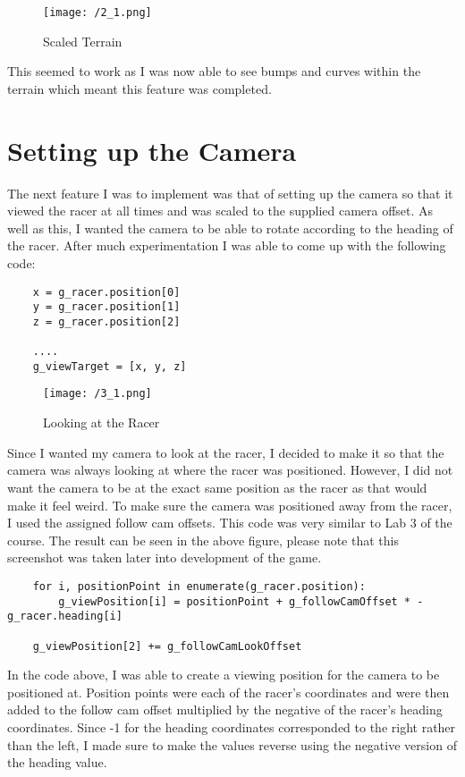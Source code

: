 \documentclass[11pt, oneside, a4paper]{article}
\begin{document}
\begin{figure}[!ht]
	\centerline{\texttt{[image: /2\_1.png]}}
	\caption{Scaled Terrain}
	\label{fig:figure1}
\end{figure}

This seemed to work as I was now able to see bumps and curves within the terrain which meant this feature was completed.

\section{Setting up the Camera}
The next feature I was to implement was that of setting up the camera so that it viewed the racer at all times and was scaled to the supplied camera offset. As well as this, I wanted the camera to be able to rotate according to the heading of the racer. After much experimentation I was able to come up with the following code:

\begin{lstlisting}  
    x = g_racer.position[0]
    y = g_racer.position[1]
    z = g_racer.position[2]

    ....
    g_viewTarget = [x, y, z]
\end{lstlisting}

\begin{figure}[!ht]
	\centerline{\texttt{[image: /3\_1.png]}}
	\caption{Looking at the Racer}
	\label{fig:figure2}
\end{figure}

Since I wanted my camera to look at the racer, I decided to make it so that the camera was always looking at where the racer was positioned. However, I did not want the camera to be at the exact same position as the racer as that would make it feel weird. To make sure the camera was positioned away from the racer, I used the assigned follow cam offsets. This code was very similar to Lab 3 of the course. The result can be seen in the above figure, please note that this screenshot was taken later into development of the game.

\begin{lstlisting}  
    for i, positionPoint in enumerate(g_racer.position): 
        g_viewPosition[i] = positionPoint + g_followCamOffset * -g_racer.heading[i]

    g_viewPosition[2] += g_followCamLookOffset
\end{lstlisting}
In the code above, I was able to create a viewing position for the camera to be positioned at. Position points were each of the racer's coordinates and were then added to the follow cam offset multiplied by the negative of the racer's heading coordinates. Since -1 for the heading coordinates corresponded to the right rather than the left, I made sure to make the values reverse using the negative version of the heading value.
\end{document}
